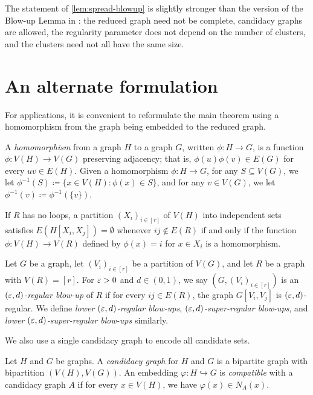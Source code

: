 \documentclass[11pt]{amsart}
\begin{document}
The statement of \cref{lem:spread-blowup} is slightly stronger than the
version of the Blow-up Lemma in \cite{RR99}: the reduced graph need not be
complete, candidacy graphs are allowed, the regularity parameter does not
depend on the number of clusters, and the clusters need not all have the same
size.

\section{An alternate formulation}\label{sec:alternate-formulation}

For applications, it is convenient to reformulate the main theorem using a
homomorphism from the graph being embedded to the reduced graph.

\begin{definition}
    A \textit{homomorphism} from a graph $H$ to a graph $G$, written $\phi : H \rightarrow G$, is a function $\phi:V(H) \rightarrow V(G) $ preserving adjacency; that is, $\phi(u)\phi(v) \in E(G)$ for every $uv \in E(H)$.
    Given a homomorphism $\phi: H\rightarrow G$, for any $S\subseteq V(G)$, we let $\phi^{-1}(S)\coloneqq \{x\in V(H):\phi(x)\in S\}$, and for any $v\in V(G)$, we let $\phi^{-1}(v)\coloneqq \phi^{-1}(\{v\})$.
\end{definition}

If $R$ has no loops, a partition $(X_i)_{i\in[r]}$ of $V(H)$ into
independent sets satisfies $E(H[X_i,X_j])=\emptyset$ whenever
$ij\notin E(R)$ if and only if the function $\phi:V(H)\rightarrow V(R)$
defined by $\phi(x)=i$ for $x\in X_i$ is a homomorphism.

\begin{definition}
    Let $G$ be a graph, let $(V_i)_{i\in[r]}$ be a partition of $V(G)$, and let $R$ be a graph with $V(R) = [r]$.
    For $\varepsilon > 0$ and $d \in (0, 1)$, we say $(G, (V_i)_{i\in[r]})$ is an \textit{$(\varepsilon, d)$-regular blow-up} of $R$ if for every $ij \in E(R)$, the graph $G[V_i, V_j]$ is $(\varepsilon, d)$-regular.  We define \textit{lower $(\varepsilon, d)$-regular blow-ups}, \textit{$(\varepsilon, d)$-super-regular blow-ups}, and \textit{lower $(\varepsilon, d)$-super-regular blow-ups} similarly.
\end{definition}

We also use a single candidacy graph to encode all candidate sets.
\begin{definition}
    Let $H$ and $G$ be graphs.  A \textit{candidacy graph} for $H$ and $G$ is a bipartite graph with bipartition $(V(H),V(G))$.   An embedding $\varphi : H \hookrightarrow G$ is \textit{compatible} with a candidacy graph $A$ if for every $x \in V(H)$, we have $\varphi(x) \in N_{A}(x)$.
\end{definition}
\end{document}
